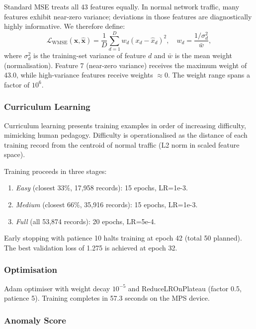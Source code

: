 \documentclass[conference]{IEEEtran}
\begin{document}
Standard MSE treats all 43 features equally. In normal network traffic, many
features exhibit near-zero variance; deviations in those features are
diagnostically highly informative. We therefore define:
\begin{equation}
  \mathcal{L}_\text{WMSE}(\mathbf{x},\hat{\mathbf{x}}) =
    \frac{1}{D}\sum_{d=1}^D w_d (x_d - \hat{x}_d)^2,
  \quad w_d = \frac{1/\sigma_d^2}{\bar{w}},
\end{equation}
where $\sigma_d^2$ is the training-set variance of feature $d$ and
$\bar{w}$ is the mean weight (normalisation). Feature 7 (near-zero variance)
receives the maximum weight of 43.0, while high-variance features receive
weights $\approx 0$. The weight range spans a factor of $10^6$.

\subsubsection{Curriculum Learning}

Curriculum learning \cite{bengio2009curriculum} presents training examples in
order of increasing difficulty, mimicking human pedagogy. Difficulty is
operationalised as the distance of each training record from the centroid of
normal traffic (L2 norm in scaled feature space).

Training proceeds in three stages:
\begin{enumerate}
  \item \emph{Easy} (closest 33\%, 17{,}958 records): 15 epochs, LR=1e-3.
  \item \emph{Medium} (closest 66\%, 35{,}916 records): 15 epochs, LR=1e-3.
  \item \emph{Full} (all 53{,}874 records): 20 epochs, LR=5e-4.
\end{enumerate}
Early stopping with patience 10 halts training at epoch 42 (total 50 planned).
The best validation loss of 1.275 is achieved at epoch 32.

\subsubsection{Optimisation}

Adam optimiser with weight decay $10^{-5}$ and ReduceLROnPlateau (factor 0.5,
patience 5). Training completes in 57.3 seconds on the MPS device.

\subsubsection{Anomaly Score}
\end{document}
